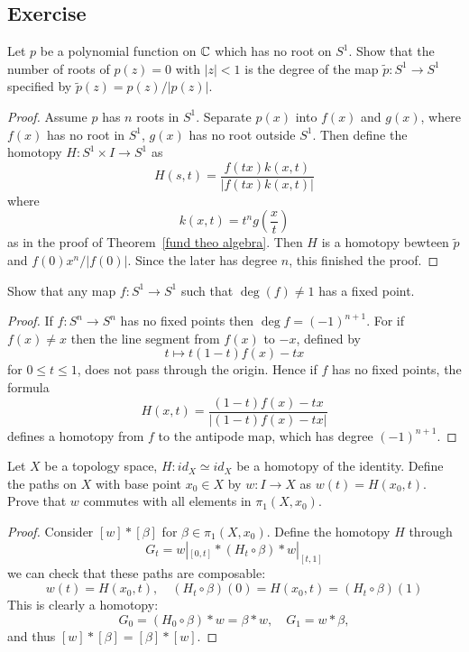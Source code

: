 \subsection{Exercise}
\begin{exercise}
Let $p$ be a polynomial function on $\mathbb{C}$ which has no root on $S^1$. Show that
the number of roots of $p(z)=0$ with $|z|<1$ is the degree of the map $\widetilde{p}:S^1\to S^1$ specified by $\widetilde{p}(z)=p(z)/|p(z)|$.
\end{exercise}
\begin{proof}
Assume $p$ has $n$ roots in $S^1$. Separate $p(x)$ into $f(x)$ and $g(x)$, where $f(x)$ has no root in $S^1$, $g(x)$ has no root outside $S^1$. Then define the homotopy $H:S^1\times I\to S^1$ as
\[H(s,t)=\dfrac{f(tx)k(x,t)}{|f(tx)k(x,t)|}\]
where 
\[k(x,t)=t^ng(\dfrac{x}{t})\]
as in the proof of Theorem~\ref{fund theo algebra}. Then $H$ is a homotopy bewteen $\widetilde{p}$ and $f(0)x^n/|f(0)|$. Since the later has degree $n$, this finished the proof.
\end{proof}
\begin{exercise}
Show that any map $f:S^1\to S^1$ such that $\deg(f)\neq1$ has a fixed point.
\end{exercise}
\begin{proof}
If $f:S^n\to S^n$ has no fixed points then $\deg f=(-1)^{n+1}$. For if $f(x)\neq x$ then the line segment from $f(x)$ to $-x$, defined by 
\[t\mapsto t(1-t)f(x)-tx\]
for $0\leq t\leq 1$, does not pass through the origin. Hence if $f$ has no fixed points, the formula
\[H(x,t)=\dfrac{(1-t)f(x)-tx}{|(1-t)f(x)-tx|}\]
defines a homotopy from $f$ to the antipode map, which has degree $(-1)^{n+1}$.
\end{proof}
\begin{exercise}
Let $X$ be a topology space, $H:id_X\simeq id_X$ be a homotopy of the identity. Define the paths on $X$ with base point $x_0\in X$ by $w:I\to X$ as $w(t)=H(x_0,t)$. Prove that $w$ commutes with all elements in $\pi_1(X,x_0)$.
\end{exercise}
\begin{proof}
Consider $[w]\ast[\beta]$ for $\beta\in\pi_1(X,x_0)$. Define the homotopy $H$ through
\[G_t=w|_{[0,t]}\ast(H_t\circ\beta)\ast w|_{[t,1]}\]
we can check that these paths are composable:
\[w(t)=H(x_0,t),\quad (H_t\circ\beta)(0)=H(x_0,t)=(H_t\circ\beta)(1)\]
This is clearly a homotopy:
\[G_0=(H_0\circ\beta)\ast w=\beta\ast w,\quad G_1=w\ast\beta,\]
and thus $[w]\ast[\beta]=[\beta]\ast[w]$.
\end{proof}
